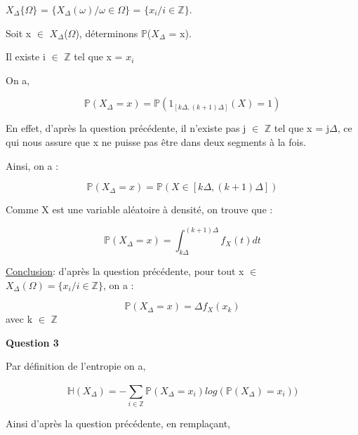 \documentclass{article}
\begin{document}
$X_{\Delta}\{\Omega\}$ = $\{X_{\Delta}(\omega) / \omega \in \Omega\}$ = $\{ x_i / i \in \mathbb{Z} \}$.

\vspace{2\baselineskip}

Soit x $\in$ $X_{\Delta}$($\Omega$), déterminons $\mathbb{P}$($X_{\Delta}$ = x).

Il existe i $\in$ $\mathbb{Z}$ tel que x = $x_i$

On a,

$$ \mathbb{P}(X_{\Delta} = x) = \mathbb{P}(1_{[k\Delta, (k+1)\Delta]}(X) = 1) $$

\newpage

En effet, d'après la question précédente, il n'existe pas j $\in$ $\mathbb{Z}$ tel que x = j$\Delta$, ce qui nous assure que x ne puisse pas être dans deux segments à la fois.

\vspace{2\baselineskip}

Ainsi, on a : 

$$ \mathbb{P}(X_{\Delta} = x) = \mathbb{P}(X \in [k\Delta, (k+1)\Delta]) $$

\vspace{2\baselineskip}

Comme X est une variable aléatoire à densité, on trouve que :

$$ \mathbb{P}(X_{\Delta} = x) = \int_{k\Delta}^{(k+1)\Delta} f_X(t)dt $$

\vspace{2\baselineskip}

\underline{Conclusion}: d'après la question précédente, pour tout x $\in$ $X_{\Delta}(\Omega) = \{x_i / i \in \mathbb{Z}\} $, on a : 

$$ \mathbb{P}(X_{\Delta} = x) = \Delta f_X(x_k) $$ avec k $\in$ $\mathbb{Z}$

\vspace{2\baselineskip}

	\textbf{Question 3}

\vspace{2\baselineskip}

Par définition de l'entropie on a,

$$ \mathbb{H}(X_{\Delta}) = - \sum_{i\in\mathbb{Z}}^{} \mathbb{P}(X_{\Delta} = x_i)log(\mathbb{P}(X_{\Delta}) = x_i)) $$

\vspace{2\baselineskip}

Ainsi d'après la question précédente, en remplaçant,
\end{document}
